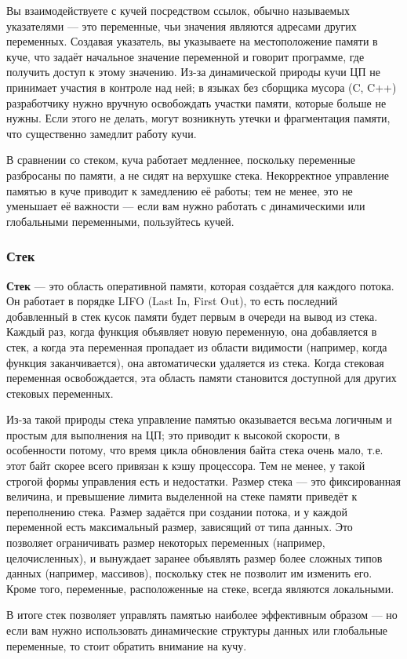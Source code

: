 \documentclass[12pt]{matmex-diploma}
\begin{document}
        Вы взаимодействуете с кучей посредством ссылок, обычно называемых указателями — это переменные, чьи значения являются адресами других переменных. Создавая указатель, вы указываете на местоположение памяти в куче, что задаёт начальное значение переменной и говорит программе, где получить доступ к этому значению. Из-за динамической природы кучи ЦП не принимает участия в контроле над ней; в языках без сборщика мусора (C, C++) разработчику нужно вручную освобождать участки памяти, которые больше не нужны. Если этого не делать, могут возникнуть утечки и фрагментация памяти, что существенно замедлит работу кучи.

        В сравнении со стеком, куча работает медленнее, поскольку переменные разбросаны по памяти, а не сидят на верхушке стека. Некорректное управление памятью в куче приводит к замедлению её работы; тем не менее, это не уменьшает её важности — если вам нужно работать с динамическими или глобальными переменными, пользуйтесь кучей.
    
    \subsubsection*{Стек}
        \textbf{Стек} — это область оперативной памяти, которая создаётся для каждого потока. Он работает в порядке LIFO (Last In, First Out),  то есть последний добавленный в стек кусок памяти будет первым в очереди на вывод из стека. Каждый раз, когда функция объявляет новую переменную, она добавляется в стек, а когда эта переменная пропадает из области видимости (например, когда функция заканчивается), она автоматически удаляется из стека. Когда стековая переменная освобождается, эта область памяти становится доступной для других стековых переменных.

        Из-за такой природы стека управление памятью оказывается весьма логичным и простым для выполнения на ЦП; это приводит к высокой скорости, в особенности потому, что время цикла обновления байта стека очень мало, т.е. этот байт скорее всего привязан к кэшу процессора. Тем не менее, у такой строгой формы управления есть и недостатки. Размер стека — это фиксированная величина, и превышение лимита выделенной на стеке памяти приведёт к переполнению стека. Размер задаётся при создании потока, и у каждой переменной есть максимальный размер, зависящий от типа данных. Это позволяет ограничивать размер некоторых переменных (например, целочисленных), и вынуждает заранее объявлять размер более сложных типов данных (например, массивов), поскольку стек не позволит им изменить его. Кроме того, переменные, расположенные на стеке, всегда являются локальными.

        В итоге стек позволяет управлять памятью наиболее эффективным образом — но если вам нужно использовать динамические структуры данных или глобальные переменные, то стоит обратить внимание на кучу.
\end{document}
